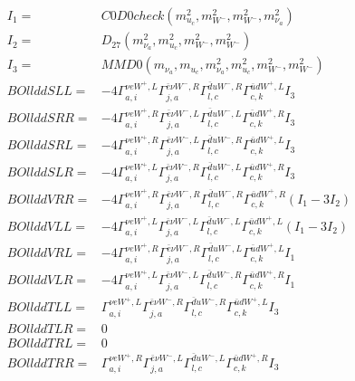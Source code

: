 \documentclass[A4,landscape]{article}
\begin{document}
\begin{align} 
I_1 = & C0D0check(m^2_{u_{{c}}}, m^2_{W^-}, m^2_{W^-}, m^2_{\nu_{{a}}}) \\ 
I_2 = & D_{27}(m^2_{\nu_{{a}}}, m^2_{u_{{c}}}, m^2_{W^-}, m^2_{W^-}) \\ 
I_3 = & MMD0(m_{\nu_{{a}}}, m_{u_{{c}}}, m^2_{\nu_{{a}}}, m^2_{u_{{c}}}, m^2_{W^-}, m^2_{W^-}) \\ 
  BOllddSLL= & -4  \Gamma^{\nu e W^+,L}_{a, i} \Gamma^{\bar{e}\nu W^- ,R}_{j, a} \Gamma^{\bar{d}u W^- ,R}_{l, c} \Gamma^{\bar{u}d W^+,L}_{c, k} I_3 \\ 
  BOllddSRR= & -4  \Gamma^{\nu e W^+,R}_{a, i} \Gamma^{\bar{e}\nu W^- ,L}_{j, a} \Gamma^{\bar{d}u W^- ,L}_{l, c} \Gamma^{\bar{u}d W^+,R}_{c, k} I_3 \\ 
  BOllddSRL= & -4  \Gamma^{\nu e W^+,R}_{a, i} \Gamma^{\bar{e}\nu W^- ,L}_{j, a} \Gamma^{\bar{d}u W^- ,R}_{l, c} \Gamma^{\bar{u}d W^+,L}_{c, k} I_3 \\ 
  BOllddSLR= & -4  \Gamma^{\nu e W^+,L}_{a, i} \Gamma^{\bar{e}\nu W^- ,R}_{j, a} \Gamma^{\bar{d}u W^- ,L}_{l, c} \Gamma^{\bar{u}d W^+,R}_{c, k} I_3 \\ 
  BOllddVRR= & -4  \Gamma^{\nu e W^+,R}_{a, i} \Gamma^{\bar{e}\nu W^- ,R}_{j, a} \Gamma^{\bar{d}u W^- ,R}_{l, c} \Gamma^{\bar{u}d W^+,R}_{c, k} (I_1 - 3 I_2) \\ 
  BOllddVLL= & -4  \Gamma^{\nu e W^+,L}_{a, i} \Gamma^{\bar{e}\nu W^- ,L}_{j, a} \Gamma^{\bar{d}u W^- ,L}_{l, c} \Gamma^{\bar{u}d W^+,L}_{c, k} (I_1 - 3 I_2) \\ 
  BOllddVRL= & -4  \Gamma^{\nu e W^+,R}_{a, i} \Gamma^{\bar{e}\nu W^- ,R}_{j, a} \Gamma^{\bar{d}u W^- ,L}_{l, c} \Gamma^{\bar{u}d W^+,L}_{c, k} I_1 \\ 
  BOllddVLR= & -4  \Gamma^{\nu e W^+,L}_{a, i} \Gamma^{\bar{e}\nu W^- ,L}_{j, a} \Gamma^{\bar{d}u W^- ,R}_{l, c} \Gamma^{\bar{u}d W^+,R}_{c, k} I_1 \\ 
  BOllddTLL= &  \Gamma^{\nu e W^+,L}_{a, i} \Gamma^{\bar{e}\nu W^- ,R}_{j, a} \Gamma^{\bar{d}u W^- ,R}_{l, c} \Gamma^{\bar{u}d W^+,L}_{c, k} I_3 \\ 
  BOllddTLR= & 0 \\ 
  BOllddTRL= & 0 \\ 
  BOllddTRR= &  \Gamma^{\nu e W^+,R}_{a, i} \Gamma^{\bar{e}\nu W^- ,L}_{j, a} \Gamma^{\bar{d}u W^- ,L}_{l, c} \Gamma^{\bar{u}d W^+,R}_{c, k} I_3 \\ 
\end{align} 
\end{document}
